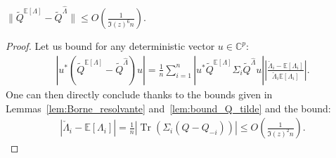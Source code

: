 \documentclass[ECP, preprint]{ejpecp} %
\DeclareMathOperator{\tr}{Tr}
\DeclareMathOperator{\diag}{Diag}
\DeclareMathOperator{\id}{Id}
\begin{document}
\begin{proposition}\label{pro:Qt1_Qt2}
    $\|\tilde Q^{\mathbb E[\Lambda]} - \tilde Q^{\hat \Lambda}\|\leq O \left( \frac{1}{\Im(z)^6  n} \right)$.
\end{proposition}
\begin{proof}
    Let us bound for any deterministic vector $u\in \mathbb C^p$:
    \begin{align*}
        \left\vert u^* (\tilde Q^{\mathbb E[\Lambda]} - \tilde Q^{\hat \Lambda})u \right\vert
        = \frac{1}{n}\sum_{i=1}^n\left\vert u^* \tilde Q^{\mathbb E[\Lambda]}\Sigma_i  \tilde Q^{\hat \Lambda} u  \right\vert \left\vert \frac{\check \Lambda_i - \mathbb E[\Lambda_i]}{\check \Lambda_i \mathbb E[\Lambda_i]} \right\vert.
    \end{align*}
    One can then directly conclude thanks to the bounds given in Lemmas~\ref{lem:Borne_resolvante} and~\ref{lem:bound_Q_tilde} and the bound:
    \begin{align*}
        |\check \Lambda_i - \mathbb E[\Lambda_i]| = \frac{1}{n}\left\vert \tr(\Sigma_i (Q - Q_{-i})) \right\vert\leq O \left( \frac{1}{\Im(z)^2 n} \right).
    \end{align*}
\end{proof}
\end{document}
